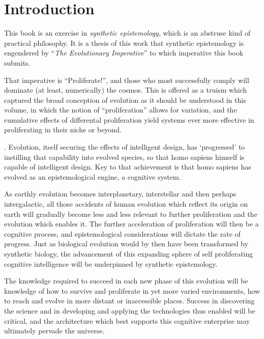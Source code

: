 \mainmatter
\chapter{Introduction}\label{chap:Introduction}

This book is an exercise in \emph{synthetic epistemology}, which is an abstruse kind of practical philosophy.
It is a thesis of this work that synthetic epistemology is engendered by ``\emph{The Evolutionary Imperative}'' to which imperative this book submits.

That imperative is ``Proliferate!'', and those who most successfully comply will dominate (at least, numerically) the cosmos.
This is offered as a truism which captured the broad conception of evolution as it should be understood in this volume, in which the notion of ``proliferation'' allows for variation, and the cumulative effects of differental proliferation yield systems ever more effective in proliferating in their niche or beyond.

.
Evolution, itself securing the effects of intelligent design, has `progressed' to instilling that capability into evolved species, so that homo sapiens himself is capable of intelligent design.
Key to that achievement is that homo sapiens has evolved as an epistemological engine, a cognitive system.

As earthly evolution becomes interplanetary, interstellar and then perhaps intergalactic, all those accidents of human evolution which reflect its origin on earth will gradually become less and less relevant to further proliferation and the evolution which enables it.
The further acceleration of proliferation will then be a cognitive process, and epistemological considerations will dictate the rate of progress.
Just as biological evolution would by then have been transformed by synthetic biology, the advancement of this expanding sphere of self proliferating cognitive intelligence will be underpinned by synthetic epistemology.

The knowledge required to succeed in each new phase of this evolution will be knowledge of how to survive and proliferate in yet more varied environments, how to reach and evolve in more distant or inaccessible places.
Success in discovering the science and in developing and applying the technologies thus enabled will be critical, and the architecture which best supports this cognitive enterprise may ultimately pervade the universe.


